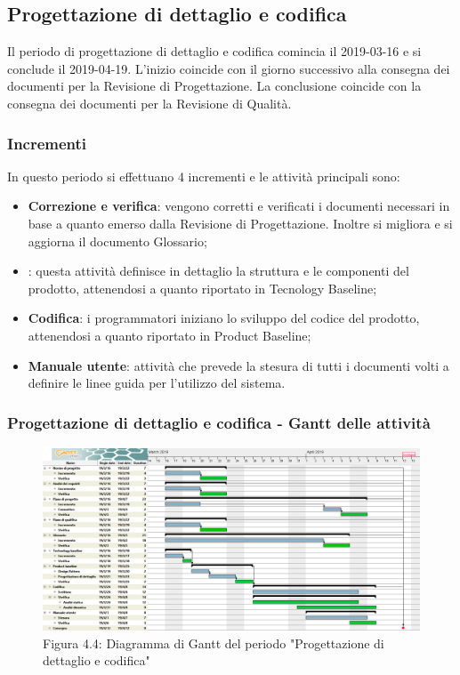 \subsection{Progettazione di dettaglio e codifica}
Il periodo di progettazione di dettaglio e codifica comincia il 2019-03-16 e si conclude il 2019-04-19. L'inizio coincide con il giorno successivo alla consegna dei documenti per la Revisione di Progettazione. La conclusione coincide con la consegna dei documenti per la Revisione di Qualità. 
\subsubsection{Incrementi}
In questo periodo si effettuano 4 incrementi e le attività principali sono:
\begin{itemize}
\item{\textbf{Correzione e verifica}: vengono corretti e verificati i documenti necessari in base a quanto emerso dalla Revisione di Progettazione. Inoltre si migliora e si aggiorna il documento Glossario;} 
\item{\textbf{}: questa attività definisce in dettaglio la struttura e le componenti del prodotto, attenendosi a quanto riportato in Tecnology Baseline;} 
\item{\textbf{Codifica}: i programmatori iniziano lo sviluppo del codice del prodotto, attenendosi a quanto riportato in Product Baseline;}	
\item{\textbf{Manuale utente}: attività che prevede la stesura di tutti i documenti volti a definire le linee guida per l'utilizzo del sistema.}
\end{itemize}

\subsubsection{Progettazione di dettaglio e codifica - Gantt delle attività}

\begin{figure} [H]
	\centering
	\includegraphics[scale=0.35]{Res/Gantt/Codifica}
	\caption{Figura 4.4: Diagramma di Gantt del periodo "Progettazione di dettaglio e codifica"}\label{}
\end{figure}

\pagebreak
